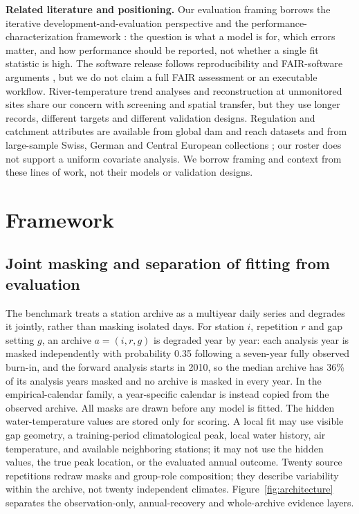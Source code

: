 \textbf{Related literature and positioning.} Our evaluation framing borrows the iterative development-and-evaluation perspective \citep{jakeman2006} and the performance-characterization framework \citep{bennett2013}: the question is what a model is for, which errors matter, and how performance should be reported, not whether a single fit statistic is high. The software release follows reproducibility and FAIR-software arguments \citep{hutton2016,barker2022}, but we do not claim a full FAIR assessment or an executable workflow. River-temperature trend analyses \citep{orr2015} and reconstruction at unmonitored sites \citep{zwart2023} share our concern with screening and spatial transfer, but they use longer records, different targets and different validation designs. Regulation and catchment attributes are available from global dam and reach datasets \citep{lehner2011,linke2019} and from large-sample Swiss, German and Central European collections \citep{hoge2023,loritz2024,klingler2021}; our roster does not support a uniform covariate analysis. We borrow framing and context from these lines of work, not their models or validation designs.

\section{Framework}

\subsection{Joint masking and separation of fitting from evaluation}

The benchmark treats a station archive as a multiyear daily series and degrades it jointly, rather than masking isolated days. For station $i$, repetition $r$ and gap setting $g$, an archive $a=(i,r,g)$ is degraded year by year: each analysis year is masked independently with probability 0.35 following a seven-year fully observed burn-in, and the forward analysis starts in 2010, so the median archive has 36\% of its analysis years masked and no archive is masked in every year. In the empirical-calendar family, a year-specific calendar is instead copied from the observed archive. All masks are drawn before any model is fitted. The hidden water-temperature values are stored only for scoring. A local fit may use visible gap geometry, a training-period climatological peak, local water history, air temperature, and available neighboring stations; it may not use the hidden values, the true peak location, or the evaluated annual outcome. Twenty source repetitions redraw masks and group-role composition; they describe variability within the archive, not twenty independent climates. Figure~\ref{fig:architecture} separates the observation-only, annual-recovery and whole-archive evidence layers.


